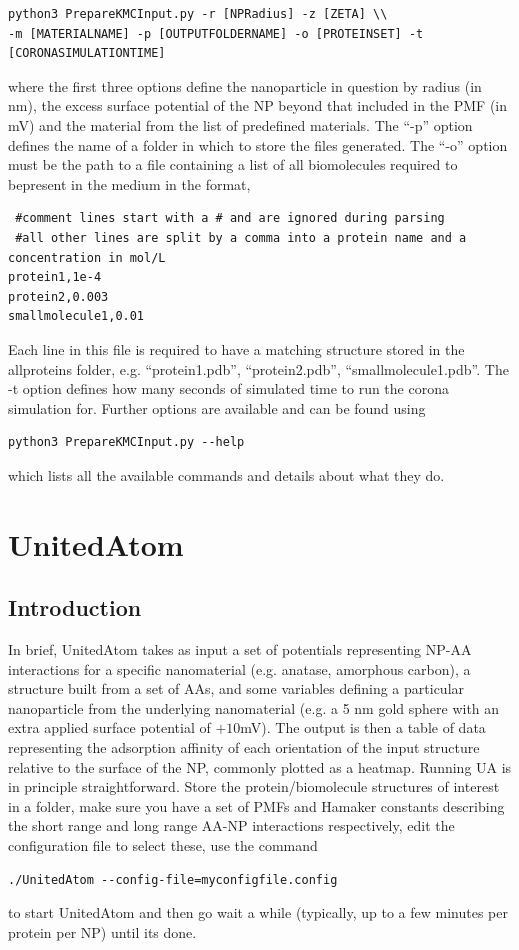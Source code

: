 \documentclass[10pt,a4paper,onecolumn]{report}
\begin{document}
\begin{lstlisting}
python3 PrepareKMCInput.py -r [NPRadius] -z [ZETA] \\
-m [MATERIALNAME] -p [OUTPUTFOLDERNAME] -o [PROTEINSET] -t [CORONASIMULATIONTIME]
\end{lstlisting}
 where the first three options define the nanoparticle in question by radius (in nm), the excess surface potential of the NP beyond that included in the PMF (in mV) and the material from the list of predefined materials. The ``-p'' option defines the name of a folder in which to store the files generated. The ``-o'' option must be the path to a file containing a list of all biomolecules required to bepresent in the medium in the format,
 \begin{lstlisting}
 #comment lines start with a # and are ignored during parsing
 #all other lines are split by a comma into a protein name and a concentration in mol/L
protein1,1e-4
protein2,0.003
smallmolecule1,0.01
\end{lstlisting}
Each line in this file is required to have a matching structure stored in the allproteins folder, e.g. ``protein1.pdb'', ``protein2.pdb'', ``smallmolecule1.pdb''. The -t option defines how many seconds of simulated time to run the corona simulation for. Further options are available and can be found using 
\begin{lstlisting}
python3 PrepareKMCInput.py --help
\end{lstlisting}
which lists all the available commands and details about what they do. 
 
 
 
\chapter{UnitedAtom}
 \section{Introduction}
 In brief, UnitedAtom takes as input a set of potentials representing NP-AA interactions for a specific nanomaterial (e.g. anatase, amorphous carbon), a structure built from a set of AAs, and some variables defining a particular nanoparticle from the underlying nanomaterial (e.g. a 5 nm gold sphere with an extra applied surface potential of $+10$mV). The output is then a table of data representing the adsorption affinity of each orientation of the input structure relative to the surface of the NP, commonly plotted as a heatmap.
  Running UA is in principle straightforward. Store the protein/biomolecule structures of interest in a folder, make sure you have a set of PMFs and Hamaker constants describing the short range and long range AA-NP interactions respectively, edit the configuration file to select these, use the command
\begin{lstlisting}
./UnitedAtom --config-file=myconfigfile.config
\end{lstlisting}
to start UnitedAtom and then go wait a while (typically, up to a few minutes per protein per NP) until its done. 
\end{document}

